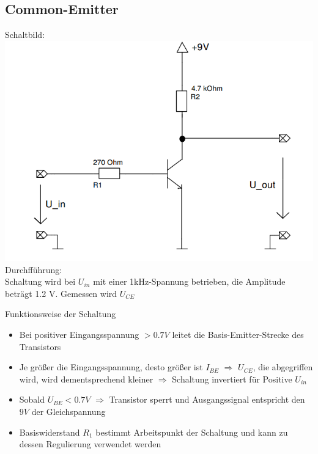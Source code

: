 \documentclass[compress,11pt]{beamer}
\begin{document}
\subsection{Common-Emitter}
\begin{frame}
Schaltbild:\\
\includegraphics[width=.7\textwidth]{schaltbilder/schalt_3a}\\
Durchfführung:\\ Schaltung wird bei $U_{in}$ mit einer 1kHz-Spannung betrieben, die Amplitude beträgt 1.2 V. Gemessen wird $U_{CE}$
\end{frame}
\begin{frame}
\begin{block}{Funktionsweise der Schaltung}

\begin{itemize}
\item Bei positiver Eingangsspannung $> 0.7 V$ leitet die Basis-Emitter-Strecke des Transistors
\item Je größer die Eingangsspannung, desto größer ist $I_{BE}$ $\Rightarrow$ $U_{CE}$, die abgegriffen wird, wird dementsprechend kleiner $\Rightarrow$ Schaltung invertiert für Positive $U_{in}$
\item Sobald $U_{BE} < 0.7 V$ $\Rightarrow$ Transistor sperrt und Ausgangssignal entspricht den $9 V$ der Gleichspannung
\item Basiswiderstand $R_1$ bestimmt Arbeitspunkt der Schaltung und kann zu dessen Regulierung verwendet werden
\end{itemize}
\end{block}
\end{frame}
\end{document}
